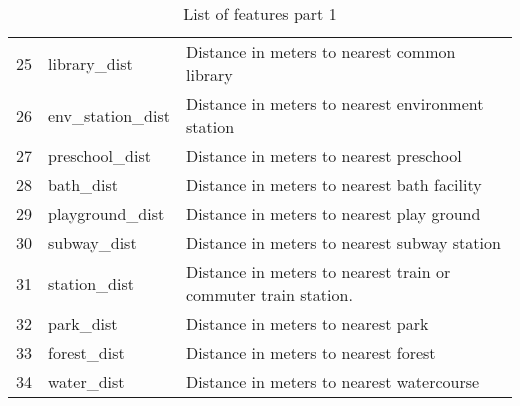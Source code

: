 \begin{table}[H]
\begin{tabular}{ | l | l | p{7cm} | }
25 & library\_dist & Distance in meters to nearest common library\\
26 & env\_station\_dist & Distance in meters to nearest environment station \\
27 & preschool\_dist & Distance in meters to nearest preschool \\
28 & bath\_dist & Distance in meters to nearest bath facility \\
29 & playground\_dist & Distance in meters to nearest play ground \\
30 & subway\_dist & Distance in meters to nearest subway station \\
31 & station\_dist & Distance in meters to nearest train or commuter train station. \\
32 & park\_dist & Distance in meters to nearest park \\
33 & forest\_dist & Distance in meters to nearest forest \\
34 & water\_dist & Distance in meters to nearest watercourse \\
\hline
\end{tabular}
\caption{List of features part 1}
\label{tab:feature_list1}
\end{table}

